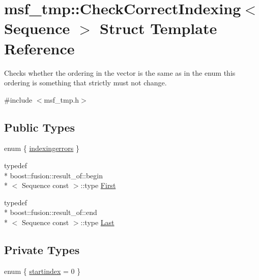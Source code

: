 \hypertarget{structmsf__tmp_1_1CheckCorrectIndexing}{\section{msf\-\_\-tmp\-:\-:Check\-Correct\-Indexing$<$ Sequence $>$ Struct Template Reference}
\label{structmsf__tmp_1_1CheckCorrectIndexing}
}


Checks whether the ordering in the vector is the same as in the enum this ordering is something that strictly must not change.  




{\ttfamily \#include $<$msf\-\_\-tmp.\-h$>$}

\subsection*{Public Types}
\begin{DoxyCompactItemize}
\item 
enum \{ \hyperlink{structmsf__tmp_1_1CheckCorrectIndexing_a7b901fddcf28d3ef12596145683b3dcea105be566424a5c65c0002623bc3f6991}{indexingerrors}
 \}
\item 
typedef \\*
boost\-::fusion\-::result\-\_\-of\-::begin\\*
$<$ Sequence const  $>$\-::type \hyperlink{structmsf__tmp_1_1CheckCorrectIndexing_ac3c063547e54cc6ccb428b105beb2182}{First}
\item 
typedef \\*
boost\-::fusion\-::result\-\_\-of\-::end\\*
$<$ Sequence const  $>$\-::type \hyperlink{structmsf__tmp_1_1CheckCorrectIndexing_a982feae67056fb51898a6019ab5ce02f}{Last}
\end{DoxyCompactItemize}
\subsection*{Private Types}
\begin{DoxyCompactItemize}
\item 
enum \{ \hyperlink{structmsf__tmp_1_1CheckCorrectIndexing_a40ceefe977463fe08fcd21923237fd87a785a2e2a1ad4a81a59d84aee58f77034}{startindex} =  0
 \}
\end{DoxyCompactItemize}


